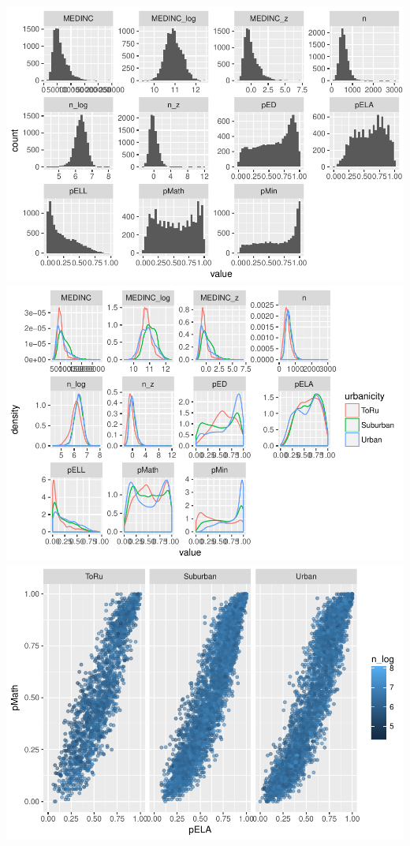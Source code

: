 \documentclass[floatsintext,man]{apa6}
\theoremstyle{definition}
\theoremstyle{definition}
\theoremstyle{definition}
\theoremstyle{remark}
\begin{document}
\includegraphics{Method_files/figure-latex/distributions-1.pdf}
\includegraphics{Method_files/figure-latex/distributions-2.pdf}
\includegraphics{Method_files/figure-latex/distributions-3.pdf}
\end{document}
